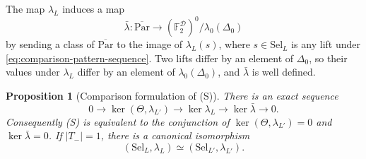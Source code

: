 \documentclass[11pt]{article}
\theoremstyle{plain}
\newtheorem{proposition}[theorem]{Proposition}
\theoremstyle{definition}
\theoremstyle{remark}
\newcommand{\F}{\mathbb F}
\begin{document}
The map $\lambda_L$ induces a map
\[
 \bar\lambda:\overline{\mathrm{Par}}\longrightarrow
           (\F_2^{\mathcal D})^0/\lambda_0(\Delta_0)
\]
by sending a class of $\overline{\mathrm{Par}}$ to the image of
$\lambda_L(s)$, where $s\in\mathrm{Sel}_L$ is any lift under
\eqref{eq:comparison-pattern-sequence}.  Two lifts differ by an element of
$\Delta_0$, so their values under $\lambda_L$ differ by an element of
$\lambda_0(\Delta_0)$, and $\bar\lambda$ is well defined.

\begin{proposition}[Comparison formulation of (S)]
\label{prop:comparison}
There is an exact sequence
\begin{equation}\label{eq:comparison-kernel-sequence}
 0\longrightarrow\ker(\Theta,\lambda_{L'})
  \longrightarrow\ker\lambda_L
  \longrightarrow\ker\bar\lambda\longrightarrow0.
\end{equation}
Consequently (S) is equivalent to the conjunction of
$\ker(\Theta,\lambda_{L'})=0$ and $\ker\bar\lambda=0$.
If $|T_-|=1$, there is a canonical isomorphism
\[
 (\mathrm{Sel}_L,\lambda_L)\simeq(\mathrm{Sel}_{L'},\lambda_{L'}).
\]
\end{proposition}
\end{document}
